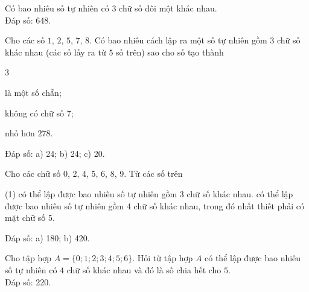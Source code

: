 \begin{baitap}
	Có bao nhiêu số tự nhiên có 3 chữ số đôi một khác nhau. \\
	\hspace*{6cm} {\sf\fontsize{10pt}{1pt}\selectfont Đáp số: 648.}
\end{baitap} 

\begin{baitap}
	Cho các số $1$, $2$, $5$, $7$, $8$. Có bao nhiêu cách lập ra một số tự nhiên gồm $3$ chữ số khác nhau (các số lấy ra từ $5$ số trên) sao cho số tạo thành
	\begin{enumEX}[a)]{3}
		\item là một số chẵn;
		\item không có chữ số $7$;
		\item nhỏ hơn $278$.
	\end{enumEX}
\hspace*{6cm} {\sf\fontsize{10pt}{1pt}\selectfont Đáp số: a) 24; \quad b) 24; \quad c) 20.}
\loigiai{
}
\end{baitap} 

\begin{baitap}
	Cho các chữ số 0, 2, 4, 5, 6, 8, 9. Từ các số trên
	\begin{tasks}(1)
		\task có thể lập được bao nhiêu số tự nhiên gồm 3 chữ số khác nhau.
		\task có thể lập được bao nhiêu số tự nhiên gồm 4 chữ số khác nhau, trong đó nhất thiết phải có mặt chữ số 5.
	\end{tasks}
	\hspace*{6cm} {\sf\fontsize{10pt}{1pt}\selectfont Đáp số: a) 180; \quad b) 420.}
	\loigiai{
	}
\end{baitap} 


\begin{baitap}
	Cho tập hợp $A=\{0; 1; 2; 3; 4; 5; 6\}$. Hỏi từ tập hợp $A$ có thể lập được bao nhiêu số tự nhiên có $4$ chữ số khác nhau và đó là số chia hết cho $5$.\\
	\hspace*{6cm} {\sf\fontsize{10pt}{1pt}\selectfont Đáp số: 220. }
\end{baitap} 

